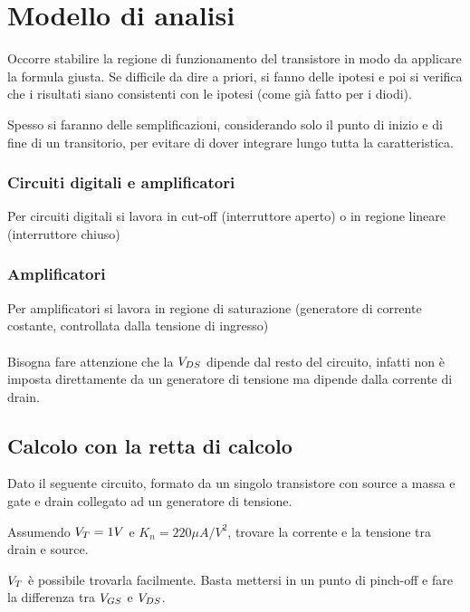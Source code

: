 \newpage
\section{Modello di analisi}
Occorre	stabilire	la	regione	di	funzionamento	del	transistore	in	modo	da	applicare	la	formula	giusta. Se	difficile	da	dire	a	priori,	si	fanno	delle	ipotesi	e	poi	si	verifica	
che	i	risultati	siano	consistenti	con	le	ipotesi	(come	già	fatto	
per	i	diodi).

Spesso	si	faranno	delle	semplificazioni,	considerando	solo	il	
punto	di	inizio	e	di	fine	di	un	transitorio,	per	evitare	di	dover	
integrare	lungo	tutta	la	caratteristica.

\subsubsection{Circuiti digitali e amplificatori}

Per	circuiti	digitali	si	lavora	in	cut-off	(interruttore	aperto)	o	in	
regione	lineare	(interruttore	chiuso)

\subsubsection{Amplificatori}

Per	amplificatori	si	lavora	in	regione	di	saturazione	(generatore	
di	corrente	costante,	controllata	dalla	tensione	di	ingresso)

\paragraph{}
Bisogna fare attenzione che la $V_{DS}$ dipende dal resto del circuito, infatti non 	è	imposta	direttamente	da	un
generatore	di	tensione ma dipende	dalla	corrente	di	drain.

\subsection{Calcolo con la retta di calcolo}

Dato il seguente circuito, formato da un singolo transistore con source a massa e gate e drain collegato ad un generatore di tensione.

Assumendo $V_{T} = 1V$ e $K_n = 220 \mu A/V^2$, trovare la corrente e la tensione tra drain e source.

$V_{T}$ è possibile trovarla facilmente. Basta mettersi in un punto di pinch-off e fare la differenza tra $V_{GS}$ e $V_{DS}$.
\paragraph{}

